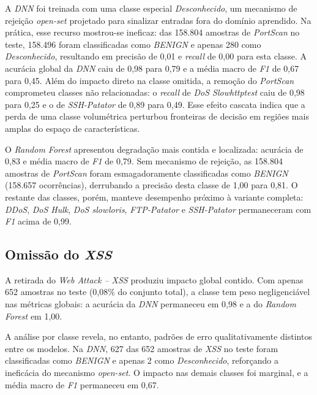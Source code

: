A \textit{DNN} foi treinada com uma classe especial \textit{Desconhecido}, um mecanismo de rejeição \textit{open-set} projetado para sinalizar entradas fora do domínio aprendido. Na prática, esse recurso mostrou-se ineficaz: das 158.804 amostras de \textit{PortScan} no teste, 158.496 foram classificadas como \textit{BENIGN} e apenas 280 como \textit{Desconhecido}, resultando em precisão de 0,01 e \textit{recall} de 0,00 para esta classe. A acurácia global da \textit{DNN} caiu de 0,98 para 0,79 e a média macro de \textit{F1} de 0,67 para 0,45. Além do impacto direto na classe omitida, a remoção do \textit{PortScan} comprometeu classes não relacionadas: o \textit{recall} de \textit{DoS Slowhttptest} caiu de 0,98 para 0,25 e o de \textit{SSH-Patator} de 0,89 para 0,49. Esse efeito cascata indica que a perda de uma classe volumétrica perturbou fronteiras de decisão em regiões mais amplas do espaço de características.

O \textit{Random Forest} apresentou degradação mais contida e localizada: acurácia de 0,83 e média macro de \textit{F1} de 0,79. Sem mecanismo de rejeição, as 158.804 amostras de \textit{PortScan} foram esmagadoramente classificadas como \textit{BENIGN} (158.657 ocorrências), derrubando a precisão desta classe de 1,00 para 0,81. O restante das classes, porém, manteve desempenho próximo à variante completa: \textit{DDoS}, \textit{DoS Hulk}, \textit{DoS slowloris}, \textit{FTP-Patator} e \textit{SSH-Patator} permaneceram com \textit{F1} acima de 0,99.









\subsection{Omissão do \textit{XSS}}

A retirada do \textit{Web Attack -- XSS} produziu impacto global contido. Com apenas 652 amostras no teste (0,08\% do conjunto total), a classe tem peso negligenciável nas métricas globais: a acurácia da \textit{DNN} permaneceu em 0,98 e a do \textit{Random Forest} em 1,00.

A análise por classe revela, no entanto, padrões de erro qualitativamente distintos entre os modelos. Na \textit{DNN}, 627 das 652 amostras de \textit{XSS} no teste foram classificadas como \textit{BENIGN} e apenas 2 como \textit{Desconhecido}, reforçando a ineficácia do mecanismo \textit{open-set}. O impacto nas demais classes foi marginal, e a média macro de \textit{F1} permaneceu em 0,67.

